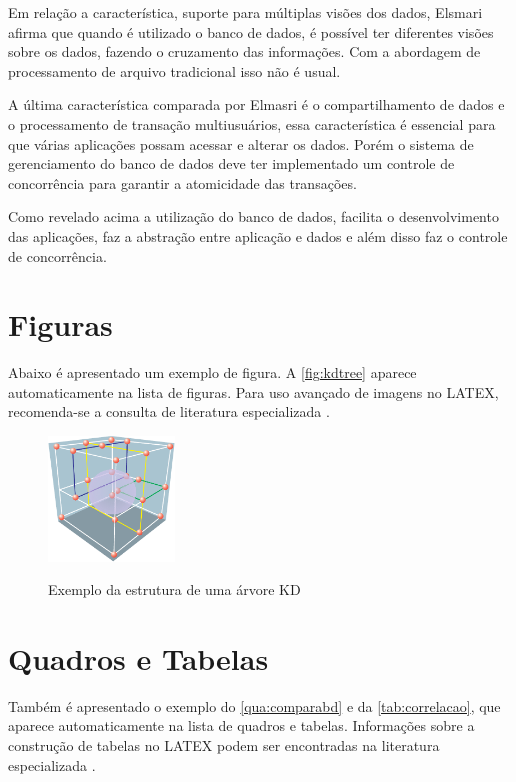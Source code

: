 Em relação a característica, suporte para múltiplas visões dos dados, Elsmari afirma que quando é utilizado o banco de dados, é possível ter diferentes visões sobre os dados, fazendo o cruzamento das informações. Com a abordagem de processamento de arquivo tradicional isso não é usual.


A última característica comparada por Elmasri é o compartilhamento de dados e o processamento de transação multiusuários, essa característica é essencial para que várias aplicações possam acessar e alterar os dados. Porém o sistema de gerenciamento do banco de dados deve ter implementado um controle de concorrência para garantir a atomicidade das transações.

Como revelado acima a utilização do banco de dados, facilita o desenvolvimento das aplicações, faz a abstração entre aplicação e dados e além disso faz o controle de concorrência.

\section{Figuras}
\label{sec:figuras}

Abaixo é apresentado um exemplo de figura.
A \autoref{fig:kdtree} aparece automaticamente na lista de figuras.
Para uso avançado de imagens no LATEX, recomenda-se a consulta de literatura especializada \cite{Goossens2007}.

\begin{figure}[!htb]
    \centering
    \caption{Exemplo da estrutura de uma árvore KD}
    \includegraphics[width=0.3\textwidth]{./04-figuras/figkdtree}
    \label{fig:kdtree}
\end{figure}

\section{Quadros e Tabelas}
\label{sec:tabelas}

Também é apresentado o exemplo do \autoref{qua:comparabd} e da \autoref{tab:correlacao}, que aparece automaticamente na lista de quadros e tabelas.
Informações sobre a construção de tabelas no LATEX podem ser encontradas na literatura especializada \cite{Lamport1986,Buerger1989,Kopka2003,Mittelbach2004}.

